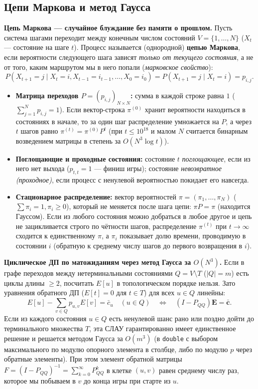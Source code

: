 \documentclass[10pt,a4paper]{article}
\renewcommand{\le}{\leqslant}
\renewcommand{\ge}{\geqslant}
\begin{document}
\subsection{Цепи Маркова и метод Гаусса}

\textbf{Цепь Маркова — случайное блуждание без памяти о прошлом.} Пусть система шагами переходит между конечным числом состояний $V = \{1, \dots, N\}$ ($X_t$ — состояние на шаге $t$). Процесс называется (однородной) \textbf{цепью Маркова}, если вероятности следующего шага зависят \emph{только от текущего состояния}, а не от того, каким маршрутом мы в него попали (\emph{марковское свойство}):
\[
  P(X_{t + 1} = j \mid X_t = i, X_{t - 1} = i_{t - 1}, \dots, X_0 = i_0) = P(X_{t + 1} = j \mid X_t = i) = p_{i,j}.
\]
\begin{itemize}
  \item \textbf{Матрица переходов $P = (p_{i,j})_{N \times N}$:} сумма в каждой строке равна $1$ ($\sum_{j=1}^N p_{i,j} = 1$). Если вектор-строка $\pi^{(0)}$ хранит вероятности находиться в состояниях в начале, то за один шаг распределение умножается на $P$, а через $t$ шагов равно $\pi^{(t)} = \pi^{(0)} P^t$ (при $t \le 10^{18}$ и малом $N$ считается бинарным возведением матрицы в степень за $O(N^3 \log t)$).
  \item \textbf{Поглощающие и проходные состояния:} состояние $t$ \emph{поглощающее}, если из него нет выхода ($p_{t,t} = 1$ — финиш игры); состояние \emph{невозвратное (проходное)}, если процесс с ненулевой вероятностью покидает его навсегда.
  \item \textbf{Стационарное распределение:} вектор вероятностей $\pi = (\pi_1, \dots, \pi_N)$ ($\sum \pi_i = 1, \pi_i \ge 0$), который не меняется после шага цепи: $\pi P = \pi$ (находится Гауссом). Если из любого состояния можно добраться в любое другое и цепь не зацикливается строго по чётности шагов, распределение $\pi^{(t)}$ при $t \to \infty$ сходится к единственному $\pi$, а $\pi_i$ показывает долю времени, проводимую в состоянии $i$ (обратную к среднему числу шагов до первого возвращения в $i$).
\end{itemize}

\textbf{Циклическое ДП по матожиданиям через метод Гаусса за $O(N^3)$.} Если в графе переходов между нетерминальными состояниями $Q = V \setminus T$ ($|Q| = m$) есть циклы длины $\ge 2$, посчитать $E[u]$ в топологическом порядке нельзя. Зато уравнения обратного ДП ($E[t] = 0$ для $t \in T$) для всех $u \in Q$ линейны:
\[
  E[u] - \sum_{v \in Q} p_{u,v} E[v] = \bar{c}_u \quad (u \in Q) \quad \Longleftrightarrow \quad (I - P_{QQ}) \mathbf{E} = \bar{\mathbf{c}}.
\]
Если из каждого состояния $u \in Q$ есть ненулевой шанс рано или поздно дойти до терминального множества $T$, эта СЛАУ гарантированно имеет единственное решение и решается методом Гаусса за $O(m^3)$ (в \texttt{double} с выбором максимального по модулю опорного элемента в столбце, либо по модулю $p$ через обратные элементы). При этом элемент обратной матрицы $F = (I - P_{QQ})^{-1} = \sum_{k=0}^\infty P_{QQ}^k$ в клетке $(u, v)$ равен среднему числу раз, которое мы побываем в $v$ до конца игры при старте из $u$.
\end{document}
